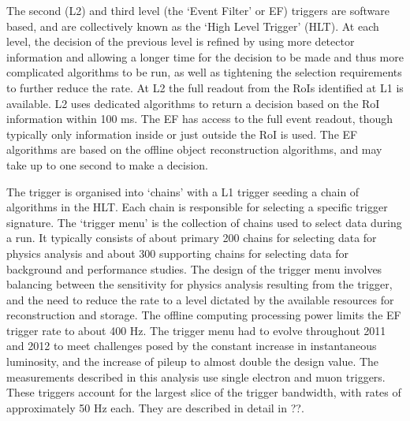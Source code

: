 The second (L2) and third level (the `Event
Filter' or EF) triggers are software based, and are collectively known as the
`High Level Trigger' (HLT). At each level, the decision of the previous level is
refined by using more detector information and allowing a longer time for the
decision to be made and thus more complicated algorithms to be run, as well as
tightening the selection requirements to further reduce the rate. At L2 the full
readout from the RoIs identified at L1 is available. L2 uses dedicated
algorithms to return a decision based on the RoI information within 100 ms. The
EF has access to the full event readout, though typically only information
inside or just outside the RoI is used. The EF algorithms are based on the
offline object reconstruction algorithms, and may take up to one second to make
a decision.

The trigger is organised into `chains' with a L1 trigger seeding a chain of
algorithms in the HLT. Each chain is responsible for selecting a specific
trigger signature. The `trigger menu' is the collection of chains used to select
data during a run. It typically consists of about primary 200 chains for selecting data
for physics analysis and about 300 supporting chains for selecting data for
background and performance studies. The design of the trigger menu involves
balancing between the sensitivity for physics analysis resulting from the
trigger, and the need to reduce the rate to a level dictated by the available
resources for reconstruction and storage. The offline computing processing power
limits the EF trigger rate to about 400 Hz. The trigger menu had to evolve
throughout 2011 and 2012 to meet challenges posed by the constant increase in
instantaneous luminosity, and the increase of pileup to almost double the design
value. The measurements described in this analysis use single electron and muon
triggers. These triggers account for the largest slice of the trigger bandwidth,
with rates of approximately 50 Hz each. They are described in detail in ??.

